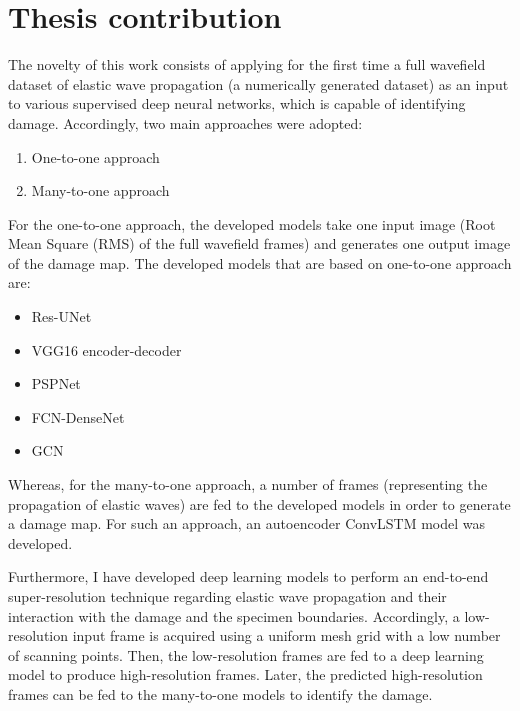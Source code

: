 \section{Thesis contribution}
\label{sec14}
The novelty of this work consists of applying for the first time a full wavefield dataset of elastic wave propagation (a numerically generated dataset) as an input to various supervised deep neural networks, which is capable of identifying damage.
Accordingly, two main approaches were adopted:
\begin{enumerate}
	\item One-to-one approach
	\item Many-to-one approach
\end{enumerate}

For the one-to-one approach, the developed models take one input image (Root Mean Square (RMS) of the full wavefield frames) and generates one output image of the damage map. 
The developed models that are based on one-to-one approach are:
\begin{itemize}
	\item Res-UNet
	\item VGG16 encoder-decoder
	\item PSPNet
	\item FCN-DenseNet
	\item GCN
\end{itemize}
Whereas, for the many-to-one approach, a number of frames (representing the propagation of elastic waves) are fed to the developed models in order to generate a damage map.
For such an approach, an autoencoder ConvLSTM model was developed.

Furthermore, I have developed deep learning models to perform an end-to-end super-resolution technique regarding elastic wave propagation and their interaction with the damage and the specimen boundaries.
Accordingly, a low-resolution input frame is acquired using a uniform mesh grid with a low number of scanning points.
Then, the low-resolution frames are fed to a deep learning model to produce high-resolution frames.
Later, the predicted high-resolution frames can be fed to the many-to-one models to identify the damage.
